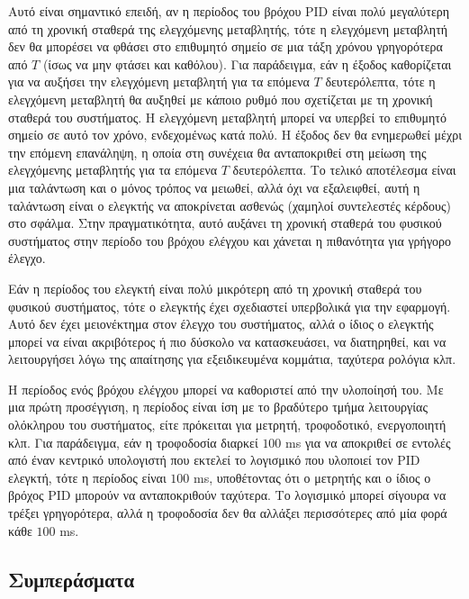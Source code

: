 Αυτό είναι σημαντικό επειδή, αν η περίοδος του βρόχου PID είναι πολύ μεγαλύτερη από τη χρονική σταθερά της ελεγχόμενης μεταβλητής, τότε η ελεγχόμενη μεταβλητή δεν θα μπορέσει να φθάσει στο επιθυμητό σημείο σε μια τάξη χρόνου γρηγορότερα από $T$ (ίσως να μην φτάσει και καθόλου). Για παράδειγμα, εάν η έξοδος καθορίζεται για να αυξήσει την ελεγχόμενη μεταβλητή για τα επόμενα $T$ δευτερόλεπτα, τότε η ελεγχόμενη μεταβλητή θα αυξηθεί με κάποιο ρυθμό που σχετίζεται με τη χρονική σταθερά του συστήματος. Η ελεγχόμενη μεταβλητή μπορεί να υπερβεί το επιθυμητό σημείο σε αυτό τον χρόνο, ενδεχομένως κατά πολύ. Η έξοδος δεν θα ενημερωθεί μέχρι την επόμενη επανάληψη, η οποία στη συνέχεια θα ανταποκριθεί στη μείωση της ελεγχόμενης μεταβλητής για τα επόμενα $T$ δευτερόλεπτα. Το τελικό αποτέλεσμα είναι μια ταλάντωση και ο μόνος τρόπος να μειωθεί, αλλά όχι να εξαλειφθεί, αυτή η ταλάντωση είναι ο ελεγκτής να αποκρίνεται ασθενώς (χαμηλοί συντελεστές κέρδους) στο σφάλμα. Στην πραγματικότητα, αυτό αυξάνει τη χρονική σταθερά του φυσικού συστήματος στην περίοδο του βρόχου ελέγχου και χάνεται η πιθανότητα για γρήγορο έλεγχο.

Εάν η περίοδος του ελεγκτή είναι πολύ μικρότερη από τη χρονική σταθερά του φυσικού συστήματος, τότε ο ελεγκτής έχει σχεδιαστεί υπερβολικά για την εφαρμογή. Αυτό δεν έχει μειονέκτημα στον έλεγχο του συστήματος, αλλά ο ίδιος ο ελεγκτής μπορεί να είναι ακριβότερος ή πιο δύσκολο να κατασκευάσει, να διατηρηθεί, και να λειτουργήσει λόγω της απαίτησης για εξειδικευμένα κομμάτια, ταχύτερα ρολόγια κλπ.

Η περίοδος ενός βρόχου ελέγχου μπορεί να καθοριστεί από την υλοποίησή του. Με μια πρώτη προσέγγιση, η περίοδος είναι ίση με το βραδύτερο τμήμα λειτουργίας ολόκληρου του συστήματος, είτε πρόκειται για μετρητή, τροφοδοτικό, ενεργοποιητή κλπ. Για παράδειγμα, εάν η τροφοδοσία διαρκεί $100$ ms για να αποκριθεί σε εντολές από έναν κεντρικό υπολογιστή που εκτελεί το λογισμικό που υλοποιεί τον PID ελεγκτή, τότε η περίοδος είναι $100$ ms, υποθέτοντας ότι ο μετρητής και ο ίδιος ο βρόχος PID μπορούν να ανταποκριθούν ταχύτερα. Το λογισμικό μπορεί σίγουρα να τρέξει γρηγορότερα, αλλά η τροφοδοσία δεν θα αλλάξει περισσότερες από μία φορά κάθε $100$ ms.

\subsection{Συμπεράσματα}

